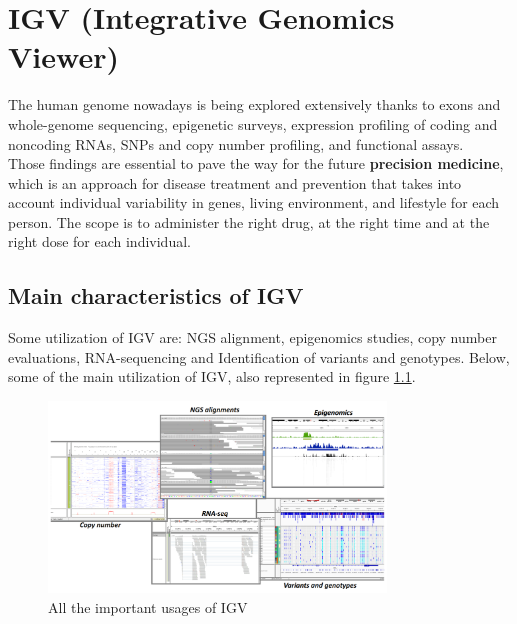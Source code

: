 \graphicspath{{chapters/IGVImages/}}

\chapter{IGV (Integrative Genomics Viewer)} \label{chap: IGV}
The human genome nowadays is being explored extensively thanks to exons and
whole-genome sequencing, epigenetic surveys, expression profiling of coding and noncoding RNAs, SNPs and copy number profiling, and functional assays.\\
Those findings are essential to pave the way for the future \textbf{precision medicine}, which is an approach for disease treatment and prevention that takes into account individual variability in genes, living environment, and lifestyle for each person. The scope is to administer the right drug, at the right time and at the right dose for each individual. 

\section{Main characteristics of IGV}
Some utilization of IGV are: NGS alignment, epigenomics studies, copy number evaluations, RNA-sequencing and Identification of variants and genotypes.
Below, some of the main utilization of IGV, also represented in figure \ref{fig:IGVusages}.

\begin{figure}[H]
    \centering
    \includegraphics[width=0.8\textwidth]{usagesIGV.PNG}
    \caption{All the important usages of IGV}
    \label{fig:IGVusages}
\end{figure}

